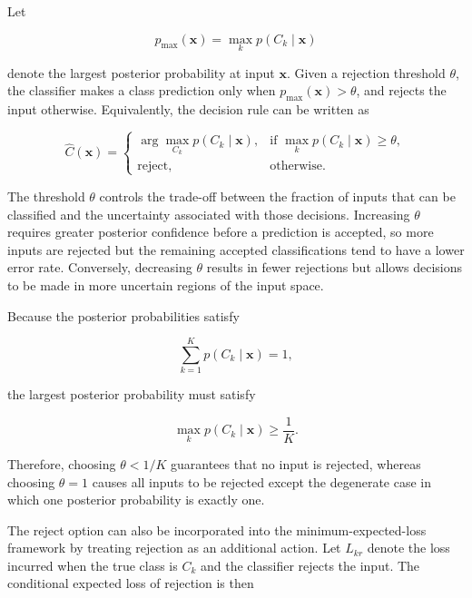 \documentclass[10pt,twocolumn]{memoir}
\begin{document}
Let

\begin{equation}
    p_{\max}(\mathbf{x}) = \max_k p(C_k\mid\mathbf{x})
\end{equation}

denote the largest posterior probability at input $\mathbf{x}$. Given a rejection threshold $\theta$, the classifier makes a class prediction only when $p_{\max}(\mathbf{x}) > \theta$, and rejects the input otherwise. Equivalently, the decision rule can be written as

\begin{equation}
    \hat{C}(\mathbf{x}) =
    \begin{cases}
        \displaystyle \arg\max_{C_k} p(C_k\mid\mathbf{x}), & \text{if } \max_k p(C_k\mid\mathbf{x}) \ge \theta,\\
        \mathrm{reject}, & \text{otherwise}.
    \end{cases}
\end{equation}

The threshold $\theta$ controls the trade-off between the fraction of inputs that can be classified and the uncertainty associated with those decisions. Increasing $\theta$ requires greater posterior confidence before a prediction is accepted, so more inputs are rejected but the remaining accepted classifications tend to have a lower error rate. Conversely, decreasing $\theta$ results in fewer rejections but allows decisions to be made in more uncertain regions of the input space.

Because the posterior probabilities satisfy

\begin{equation}
    \sum_{k=1}^{K} p(C_k\mid\mathbf{x}) = 1,
\end{equation}

the largest posterior probability must satisfy

\begin{equation}
    \max_k p(C_k\mid\mathbf{x}) \geq \frac{1}{K}.
\end{equation}

Therefore, choosing $\theta < 1/K$ guarantees that no input is rejected, whereas choosing $\theta=1$ causes all inputs to be rejected except the degenerate case in which one posterior probability is exactly one.

The reject option can also be incorporated into the minimum-expected-loss framework by treating rejection as an additional action. Let $L_{kr}$ denote the loss incurred when the true class is $C_k$ and the classifier rejects the input. The conditional expected loss of rejection is then
\end{document}
